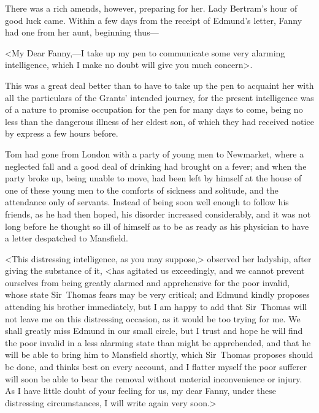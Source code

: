 There was a rich amends, however, preparing for her. Lady Bertram's hour of good luck came. Within a few days from the receipt of Edmund's letter, Fanny had one from her aunt, beginning thus—

<My Dear Fanny,—I take up my pen to communicate some very alarming intelligence, which I make no doubt will give you much concern>.

This was a great deal better than to have to take up the pen to acquaint her with all the particulars of the Grants' intended journey, for the present intelligence was of a nature to promise occupation for the pen for many days to come, being no less than the dangerous illness of her eldest son, of which they had received notice by express a few hours before.

Tom had gone from London with a party of young men to Newmarket, where a neglected fall and a good deal of drinking had brought on a fever; and when the party broke up, being unable to move, had been left by himself at the house of one of these young men to the comforts of sickness and solitude, and the attendance only of servants. Instead of being soon well enough to follow his friends, as he had then hoped, his disorder increased considerably, and it was not long before he thought so ill of himself as to be as ready as his physician to have a letter despatched to Mansfield.

<This distressing intelligence, as you may suppose,> observed her ladyship, after giving the substance of it, <has agitated us exceedingly, and we cannot prevent ourselves from being greatly alarmed and apprehensive for the poor invalid, whose state Sir~Thomas fears may be very critical; and Edmund kindly proposes attending his brother immediately, but I am happy to add that Sir~Thomas will not leave me on this distressing occasion, as it would be too trying for me. We shall greatly miss Edmund in our small circle, but I trust and hope he will find the poor invalid in a less alarming state than might be apprehended, and that he will be able to bring him to Mansfield shortly, which Sir~Thomas proposes should be done, and thinks best on every account, and I flatter myself the poor sufferer will soon be able to bear the removal without material inconvenience or injury. As I have little doubt of your feeling for us, my dear Fanny, under these distressing circumstances, I will write again very soon.>


